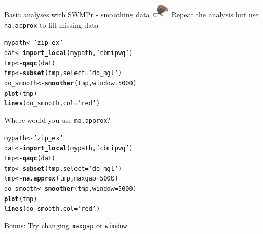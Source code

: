 \documentclass[xcolor=dvipsnames,serif]{beamer}\usepackage[]{graphicx}\usepackage[]{color}
\makeatletter
\newcommand{\hlnum}[1]{\textcolor[rgb]{0.686,0.059,0.569}{#1}}%
\newcommand{\hlstr}[1]{\textcolor[rgb]{0.192,0.494,0.8}{#1}}%
\newcommand{\hlstd}[1]{\textcolor[rgb]{0.345,0.345,0.345}{#1}}%
\newcommand{\hlkwb}[1]{\textcolor[rgb]{0.69,0.353,0.396}{#1}}%
\newcommand{\hlkwc}[1]{\textcolor[rgb]{0.333,0.667,0.333}{#1}}%
\newcommand{\hlkwd}[1]{\textcolor[rgb]{0.737,0.353,0.396}{\textbf{#1}}}%
\newenvironment{kframe}{%
 \def\at@end@of@kframe{}%
 \ifinner\ifhmode%
  \def\at@end@of@kframe{\end{minipage}}%
  \begin{minipage}{\columnwidth}%
 \fi\fi%
 \def\FrameCommand##1{\hskip\@totalleftmargin \hskip-\fboxsep
 \colorbox{shadecolor}{##1}\hskip-\fboxsep
     \hskip-\linewidth \hskip-\@totalleftmargin \hskip\columnwidth}%
 \MakeFramed {\advance\hsize-\width
   \@totalleftmargin\z@ \linewidth\hsize
   \@setminipage}}%
 {\par\unskip\endMakeFramed%
 \at@end@of@kframe}
\newenvironment{knitrout}{}{} %
\makeatother
\begin{document}
\begin{frame}[fragile,t]{Basic analyses with SWMPr - smoothing data \includegraphics[width = 0.065\textwidth]{imgs/swmprat.png}}
\onslide<+->
Repeat the analysis but use \texttt{na.approx} to fill missing data
\begin{knitrout}\scriptsize
{}\color{fgcolor}\begin{kframe}
\begin{alltt}
\hlstd{mypath} \hlkwb{<-} \hlstr{'zip_ex'}
\hlstd{dat} \hlkwb{<-} \hlkwd{import_local}\hlstd{(mypath,} \hlstr{'cbmipwq'}\hlstd{)}
\hlstd{tmp} \hlkwb{<-} \hlkwd{qaqc}\hlstd{(dat)}
\hlstd{tmp} \hlkwb{<-} \hlkwd{subset}\hlstd{(tmp,} \hlkwc{select} \hlstd{=} \hlstr{'do_mgl'}\hlstd{)}
\hlstd{do_smooth} \hlkwb{<-} \hlkwd{smoother}\hlstd{(tmp,} \hlkwc{window} \hlstd{=} \hlnum{5000}\hlstd{)}
\hlkwd{plot}\hlstd{(tmp)}
\hlkwd{lines}\hlstd{(do_smooth,} \hlkwc{col} \hlstd{=} \hlstr{'red'}\hlstd{)}
\end{alltt}
\end{kframe}
\end{knitrout}
Where would you use \texttt{na.approx}?
\onslide<+->
\begin{knitrout}\scriptsize
{}\color{fgcolor}\begin{kframe}
\begin{alltt}
\hlstd{mypath} \hlkwb{<-} \hlstr{'zip_ex'}
\hlstd{dat} \hlkwb{<-} \hlkwd{import_local}\hlstd{(mypath,} \hlstr{'cbmipwq'}\hlstd{)}
\hlstd{tmp} \hlkwb{<-} \hlkwd{qaqc}\hlstd{(dat)}
\hlstd{tmp} \hlkwb{<-} \hlkwd{subset}\hlstd{(tmp,} \hlkwc{select} \hlstd{=} \hlstr{'do_mgl'}\hlstd{)}
\hlstd{tmp} \hlkwb{<-} \hlkwd{na.approx}\hlstd{(tmp,} \hlkwc{maxgap} \hlstd{=} \hlnum{5000}\hlstd{)}
\hlstd{do_smooth} \hlkwb{<-} \hlkwd{smoother}\hlstd{(tmp,} \hlkwc{window} \hlstd{=} \hlnum{5000}\hlstd{)}
\hlkwd{plot}\hlstd{(tmp)}
\hlkwd{lines}\hlstd{(do_smooth,} \hlkwc{col} \hlstd{=} \hlstr{'red'}\hlstd{)}
\end{alltt}
\end{kframe}
\end{knitrout}
\onslide<+->
Bonus: Try changing \texttt{maxgap} or \texttt{window}
\end{frame}
\end{document}
